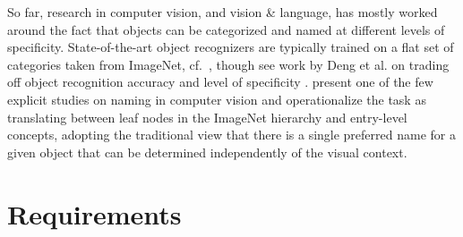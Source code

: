 \documentclass[runningheads]{llncs}
\begin{document}
So far, research in computer vision, and vision \& language, has mostly worked around the fact that objects can be categorized and named at different levels of specificity.
 State-of-the-art object recognizers are typically trained on a flat set of categories taken from ImageNet, cf.\ \cite{googlenet}, though see work by Deng et al. on trading off object recognition accuracy and level of specificity \cite{deng2012hedging}.
\cite{Ordonez:2016} present one of the few explicit studies on naming in computer vision and operationalize the task as translating between leaf nodes in the ImageNet hierarchy and entry-level
 concepts, adopting the traditional view that there is a single preferred name for a given object that can be determined independently of the visual context.

\section{Requirements}
\label{sec:requirements}
\end{document}
